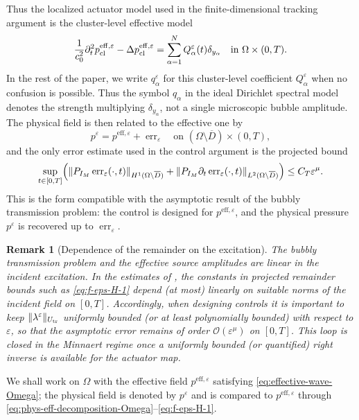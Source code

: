 \documentclass[11pt,a4paper]{article}
\numberwithin{equation}{section}
\newtheorem{remark}[theorem]{Remark}
\newcommand{\veps}{\varepsilon}
\newcommand{\norm}[1]{\left\lVert #1 \right\rVert}
\begin{document}
\newline 
Thus the localized actuator model used in the finite-dimensional tracking argument is the cluster-level effective model
\begin{equation}
\label{eq:cluster-effective-wave-Omega}
 \frac{1}{c_0^2}\partial_t^2 p^{\mathrm{eff},\veps}_{\rm cl} - \Delta p^{\mathrm{eff},\veps}_{\rm cl}
 = \sum_{\alpha=1}^N Q_\alpha^\veps(t)\delta_{y_\alpha}
 \quad\text{in }\Omega\times(0,T).
\end{equation}
In the rest of the paper, we write $q_\alpha^\veps$ for this cluster-level coefficient $Q_\alpha^\veps$ when no confusion is possible. Thus the symbol $q_\alpha$ in the ideal Dirichlet spectral model denotes the strength multiplying $\delta_{y_\alpha}$, not a single microscopic bubble amplitude. The physical field is then related to the effective one by
\begin{equation}
\label{eq:phys-eff-decomposition-Omega}
 p^\veps=p^{\mathrm{eff},\veps}+\operatorname{err}_{\veps}
 \quad\text{on }(\Omega\setminus\overline D)\times(0,T),
\end{equation}
and the only error estimate used in the control argument is the projected bound
\begin{equation}
\label{eq:f-eps-H-1}
 \sup_{t\in[0,T]}
 \Bigl(
 \norm{P_{I_M}\operatorname{err}_{\veps}(\cdot,t)}_{H^1(\Omega\setminus \overline{D})}
 +\norm{P_{I_M}\partial_t\operatorname{err}_{\veps}(\cdot,t)}_{L^2(\Omega\setminus \overline{D})}
 \Bigr)
 \le C_T\veps^\mu.
\end{equation}
This is the form compatible with the asymptotic result of the bubbly transmission problem: the control is designed for $p^{\mathrm{eff},\veps}$, and the physical pressure $p^\veps$ is recovered up to $\operatorname{err}_{\veps}$.

\begin{remark}[Dependence of the remainder on the excitation]
The bubbly transmission problem and the effective source amplitudes are linear in the incident excitation. In the estimates of \cite{MukherjeeSiniJEE,MukherjeeSiniSIAM}, the constants in projected remainder bounds such as \eqref{eq:f-eps-H-1} depend (at most) linearly on suitable norms of the incident field on $[0,T]$.
Accordingly, when designing controls it is important to keep
\(\|\lambda^\veps\|_{U_{\rm tr}}\) uniformly bounded (or at least polynomially bounded) with
respect to $\veps$, so that the asymptotic error remains of order
\(\mathcal{O}(\veps^\mu)\) on $[0,T]$.
This loop is closed in the Minnaert regime once a uniformly bounded (or
quantified) right inverse is available for the actuator map.
\end{remark}
\noindent
We shall work on $\Omega$ with the effective field $p^{\mathrm{eff},\veps}$ satisfying \eqref{eq:effective-wave-Omega}; the physical field is denoted by $p^\veps$ and is compared to $p^{\mathrm{eff},\veps}$ through \eqref{eq:phys-eff-decomposition-Omega}--\eqref{eq:f-eps-H-1}.
\end{document}
